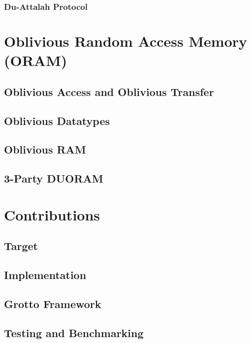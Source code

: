 \documentclass[fleqn,10pt]{olplainarticle}
\begin{document}
\subsubsection{Du-Attalah Protocol}


\section{Oblivious Random Access Memory (ORAM)}
\subsection{Oblivious Access and Oblivious Transfer}

\subsection{Oblivious Datatypes}

\subsection{Oblivious RAM}

\subsection{3-Party DUORAM}


\section{Contributions}
\subsection{Target}

\subsection{Implementation}

\subsection{Grotto Framework}

\subsection{Testing and Benchmarking}

\end{document}
